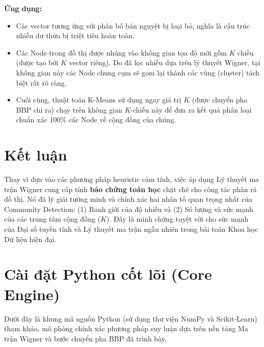\documentclass[12pt,a4paper]{article}
\begin{document}
\textbf{Ứng dụng:}
\begin{itemize}
    \item Các vector tương ứng với phân bố bán nguyệt bị loại bỏ, nghĩa là cấu trúc nhiễu dư thừa bị triệt tiêu hoàn toàn.
    \item Các Node trong đồ thị được nhúng vào không gian tọa độ mới gồm $K$ chiều (được tạo bởi $K$ vector riêng). Do đã lọc nhiễu dựa trên lý thuyết Wigner, tại không gian này các Node chung cụm sẽ gom lại thành các vùng (cluster) tách biệt rất rõ ràng.
    \item Cuối cùng, thuật toán K-Means sử dụng ngay giá trị $K$ (được chuyển pha BBP chỉ ra) chạy trên không gian $K$-chiều này để đưa ra kết quả phân loại chuẩn xác 100\% các Node về cộng đồng của chúng.
\end{itemize}

\section{Kết luận}
Thay vì dựa vào các phương pháp heuristic cảm tính, việc áp dụng Lý thuyết ma trận Wigner cung cấp tính \textbf{bảo chứng toán học} chặt chẽ cho công tác phân rã đồ thị. Nó đã lý giải tường minh và chính xác hai nhân tố quan trọng nhất của Community Detection: (1) Ranh giới của độ nhiễu và (2) Số lượng và sức mạnh của các trung tâm cộng đồng ($K$). Đây là minh chứng tuyệt vời cho sức mạnh của Đại số tuyến tính và Lý thuyết ma trận ngẫu nhiên trong bài toán Khoa học Dữ liệu hiện đại.

\section{Cài đặt Python cốt lõi (Core Engine)}

Dưới đây là khung mã nguồn Python (sử dụng thư viện NumPy và Scikit-Learn) tham khảo, mô phỏng chính xác phương pháp suy luận dựa trên nền tảng Ma trận Wigner và bước chuyển pha BBP đã trình bày.
\end{document}
